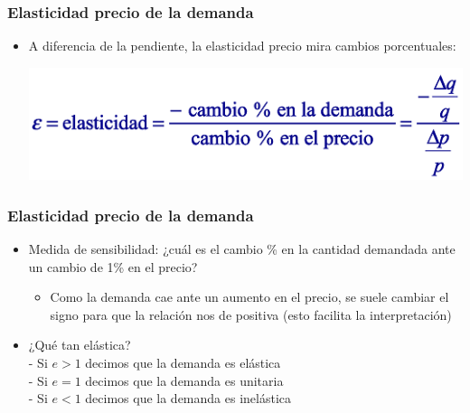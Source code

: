 \documentclass{beamer}
\begin{document}
\begin{frame}
\frametitle{Elasticidad precio de la demanda}
\begin{itemize}
    \item A diferencia de la pendiente, la elasticidad precio mira cambios porcentuales:
    \begin{center}
    \includegraphics[scale=0.7]{../Figures/Tema_06.43_elasticidadformula.png}
    \end{center}
    \end{itemize}
\end{frame}

\begin{frame}
\frametitle{Elasticidad precio de la demanda}
\begin{itemize}
    \item Medida de sensibilidad: ¿cuál es el cambio \% en la cantidad demandada ante un cambio de 1\% en el precio? \\\vspace{2mm}
    \begin{itemize}
        \item Como la demanda cae ante un aumento en el precio, se suele cambiar el signo para que la relación nos de positiva (esto facilita la interpretación)\vspace{4mm}
    \end{itemize}
    \item ¿Qué tan elástica? \\\vspace{2mm}
    - Si $e > 1$ decimos que la demanda es elástica \\
    - Si $e = 1$ decimos que la demanda es unitaria \\
    - Si $e < 1$ decimos que la demanda es inelástica
    \end{itemize}
\end{frame}

\end{document}
